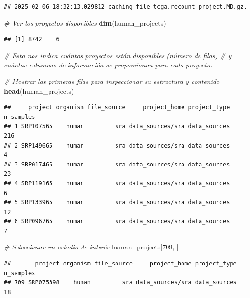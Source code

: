 \documentclass[
]{article}
\newenvironment{Shaded}{\begin{snugshade}}{\end{snugshade}}
\newcommand{\CommentTok}[1]{\textcolor[rgb]{0.56,0.35,0.01}{\textit{#1}}}
\newcommand{\DecValTok}[1]{\textcolor[rgb]{0.00,0.00,0.81}{#1}}
\newcommand{\FunctionTok}[1]{\textcolor[rgb]{0.13,0.29,0.53}{\textbf{#1}}}
\newcommand{\NormalTok}[1]{#1}
\begin{document}
\begin{verbatim}
## 2025-02-06 18:32:13.029812 caching file tcga.recount_project.MD.gz.
\end{verbatim}

\begin{Shaded}
\begin{Highlighting}[]
\CommentTok{\# Ver los proyectos disponibles}
\FunctionTok{dim}\NormalTok{(human\_projects)}
\end{Highlighting}
\end{Shaded}

\begin{verbatim}
## [1] 8742    6
\end{verbatim}

\begin{Shaded}
\begin{Highlighting}[]
\CommentTok{\# Esto nos indica cuántos proyectos están disponibles (número de filas) }
\CommentTok{\# y cuántas columnas de información se proporcionan para cada proyecto.}

\CommentTok{\# Mostrar las primeras filas para inspeccionar su estructura y contenido}
\FunctionTok{head}\NormalTok{(human\_projects)}
\end{Highlighting}
\end{Shaded}

\begin{verbatim}
##     project organism file_source     project_home project_type n_samples
## 1 SRP107565    human         sra data_sources/sra data_sources       216
## 2 SRP149665    human         sra data_sources/sra data_sources         4
## 3 SRP017465    human         sra data_sources/sra data_sources        23
## 4 SRP119165    human         sra data_sources/sra data_sources         6
## 5 SRP133965    human         sra data_sources/sra data_sources        12
## 6 SRP096765    human         sra data_sources/sra data_sources         7
\end{verbatim}

\begin{Shaded}
\begin{Highlighting}[]
\CommentTok{\# Seleccionar un estudio de interés}
\NormalTok{human\_projects[}\DecValTok{709}\NormalTok{, ]}
\end{Highlighting}
\end{Shaded}

\begin{verbatim}
##       project organism file_source     project_home project_type n_samples
## 709 SRP075398    human         sra data_sources/sra data_sources        18
\end{verbatim}
\end{document}
